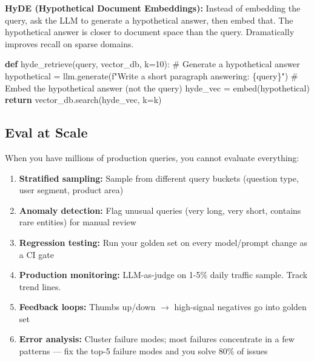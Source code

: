 \documentclass[11pt]{article}
\providecommand{\tightlist}{\setlength{\itemsep}{1pt}\setlength{\parskip}{0pt}}
\newenvironment{Shaded}{\begin{snugshade}}{\end{snugshade}}
\newcommand{\CommentTok}[1]{\textcolor[rgb]{0.48,0.49,0.49}{#1}}
\newcommand{\ControlFlowTok}[1]{\textcolor[rgb]{0.99,0.74,0.29}{\textbf{#1}}}
\newcommand{\DecValTok}[1]{\textcolor[rgb]{0.96,0.45,0.00}{#1}}
\newcommand{\KeywordTok}[1]{\textcolor[rgb]{0.81,0.81,0.76}{\textbf{#1}}}
\newcommand{\NormalTok}[1]{\textcolor[rgb]{0.81,0.81,0.76}{#1}}
\newcommand{\OperatorTok}[1]{\textcolor[rgb]{0.81,0.81,0.76}{#1}}
\newcommand{\SpecialCharTok}[1]{\textcolor[rgb]{0.24,0.68,0.91}{#1}}
\newcommand{\SpecialStringTok}[1]{\textcolor[rgb]{0.85,0.27,0.33}{#1}}
\begin{document}
\textbf{HyDE (Hypothetical Document Embeddings):} Instead of embedding the query, ask the LLM to generate a hypothetical answer, then embed that. The hypothetical answer is closer to document space than the query. Dramatically improves recall on sparse domains.


\begin{Shaded}
\begin{Highlighting}[]
\KeywordTok{def}\NormalTok{ hyde\_retrieve(query, vector\_db, k}\OperatorTok{=}\DecValTok{10}\NormalTok{):}
    \CommentTok{\# Generate a hypothetical answer}
\NormalTok{    hypothetical }\OperatorTok{=}\NormalTok{ llm.generate(}\SpecialStringTok{f"Write a short paragraph answering: }\SpecialCharTok{\{}\NormalTok{query}\SpecialCharTok{\}}\SpecialStringTok{"}\NormalTok{)}
    \CommentTok{\# Embed the hypothetical answer (not the query)}
\NormalTok{    hyde\_vec }\OperatorTok{=}\NormalTok{ embed(hypothetical)}
    \ControlFlowTok{return}\NormalTok{ vector\_db.search(hyde\_vec, k}\OperatorTok{=}\NormalTok{k)}
\end{Highlighting}
\end{Shaded}

\subsection{Eval at Scale}\label{eval-at-scale}

When you have millions of production queries, you cannot evaluate everything:

\begin{enumerate}
\def\labelenumi{\arabic{enumi}.}
\tightlist
\item
  \textbf{Stratified sampling:} Sample from different query buckets (question type, user segment, product area)
\item
  \textbf{Anomaly detection:} Flag unusual queries (very long, very short, contains rare entities) for manual review
\item
  \textbf{Regression testing:} Run your golden set on every model/prompt change as a CI gate
\item
  \textbf{Production monitoring:} LLM-as-judge on 1-5\% daily traffic sample. Track trend lines.
\item
  \textbf{Feedback loops:} Thumbs up/down \(\rightarrow\) high-signal negatives go into golden set
\item
  \textbf{Error analysis:} Cluster failure modes; most failures concentrate in a few patterns --- fix the top-5 failure modes and you solve 80\% of issues
\end{enumerate}
\end{document}
